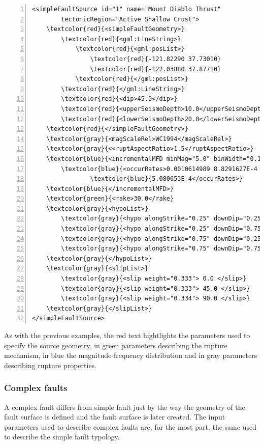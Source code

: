 \begin{Verbatim}[frame=single, commandchars=\\\{\}, fontsize=\footnotesize,
    numbers=left, numbersep=2pt]
<simpleFaultSource id="1" name="Mount Diablo Thrust" 
        tectonicRegion="Active Shallow Crust">
    \textcolor{red}{<simpleFaultGeometry>}
        \textcolor{red}{<gml:LineString>}
            \textcolor{red}{<gml:posList>}
                \textcolor{red}{-121.82290 37.73010}
                \textcolor{red}{-122.03880 37.87710}
            \textcolor{red}{</gml:posList>}
        \textcolor{red}{</gml:LineString>}
        \textcolor{red}{<dip>45.0</dip>}
        \textcolor{red}{<upperSeismoDepth>10.0</upperSeismoDepth>}
        \textcolor{red}{<lowerSeismoDepth>20.0</lowerSeismoDepth>}
    \textcolor{red}{</simpleFaultGeometry>}
    \textcolor{gray}{<magScaleRel>WC1994</magScaleRel>}
    \textcolor{gray}{<<ruptAspectRatio>1.5</ruptAspectRatio>}
    \textcolor{blue}{<incrementalMFD minMag="5.0" binWidth="0.1">}
        \textcolor{blue}{<occurRates>0.0010614989 8.8291627E-4 7.3437777E-4 6.108288E-4 }
                \textcolor{blue}{5.080653E-4</occurRates>}
    \textcolor{blue}{</incrementalMFD>}
    \textcolor{green}{<rake>30.0</rake}
    \textcolor{gray}{<hypoList>}
        \textcolor{gray}{<hypo alongStrike="0.25" downDip="0.25" weight="0.25"/>}
        \textcolor{gray}{<hypo alongStrike="0.25" downDip="0.75" weight="0.25"/>}
        \textcolor{gray}{<hypo alongStrike="0.75" downDip="0.25" weight="0.25"/>}
        \textcolor{gray}{<hypo alongStrike="0.75" downDip="0.75" weight="0.25"/>}
    \textcolor{gray}{</hypoList>}
    \textcolor{gray}{<slipList>}
        \textcolor{gray}{<slip weight="0.333"> 0.0 </slip>}
        \textcolor{gray}{<slip weight="0.333"> 45.0 </slip>}
        \textcolor{gray}{<slip weight="0.334"> 90.0 </slip>}
    \textcolor{gray}{</slipList>}
</simpleFaultSource>
\end{Verbatim}
As with the previous examples, the red text hightlights 
the parameters used to specify the source geometry, in green parameters 
describing the rupture mechanism, in blue the magnitude-frequency 
distribution and in gray parameters describing rupture properties. 
%
\subsubsection{Complex faults}
%
A complex fault differs from simple fault just by the way the geometry of 
the fault surface is defined and the fault surface is later 
created. 
The input parameters used to describe complex faults are, for the most 
part, the same used to describe the simple fault typology. 

